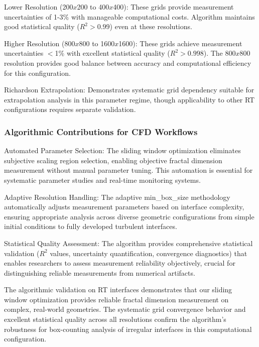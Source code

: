 \documentclass[preprint,12pt]{elsarticle}
\def\textbf#1{#1}%
\def\times{x}%
\begin{document}
\textbf{Lower Resolution (200$\times$200 to 400$\times$400):} These grids provide measurement uncertainties of 1-3\% with manageable computational costs. Algorithm maintains good statistical quality ($R^2 > 0.99$) even at these resolutions.

\textbf{Higher Resolution (800$\times$800 to 1600$\times$1600):} These grids achieve measurement uncertainties $<$1\% with excellent statistical quality ($R^2 > 0.998$). The 800$\times$800 resolution provides good balance between accuracy and computational efficiency for this configuration.

\textbf{Richardson Extrapolation:} Demonstrates systematic grid dependency suitable for extrapolation analysis in this parameter regime, though applicability to other RT configurations requires separate validation.

\subsubsection{Algorithmic Contributions for CFD Workflows}

\textbf{Automated Parameter Selection:} The sliding window optimization eliminates subjective scaling region selection, enabling objective fractal dimension measurement without manual parameter tuning. This automation is essential for systematic parameter studies and real-time monitoring systems.

\textbf{Adaptive Resolution Handling:} The adaptive min\_box\_size methodology automatically adjusts measurement parameters based on interface complexity, ensuring appropriate analysis across diverse geometric configurations from simple initial conditions to fully developed turbulent interfaces.

\textbf{Statistical Quality Assessment:} The algorithm provides comprehensive statistical validation ($R^2$ values, uncertainty quantification, convergence diagnostics) that enables researchers to assess measurement reliability objectively, crucial for distinguishing reliable measurements from numerical artifacts.

The algorithmic validation on RT interfaces demonstrates that our sliding window optimization provides reliable fractal dimension measurement on complex, real-world geometries. The systematic grid convergence behavior and excellent statistical quality across all resolutions confirm the algorithm's robustness for box-counting analysis of irregular interfaces in this computational configuration.
\end{document}
